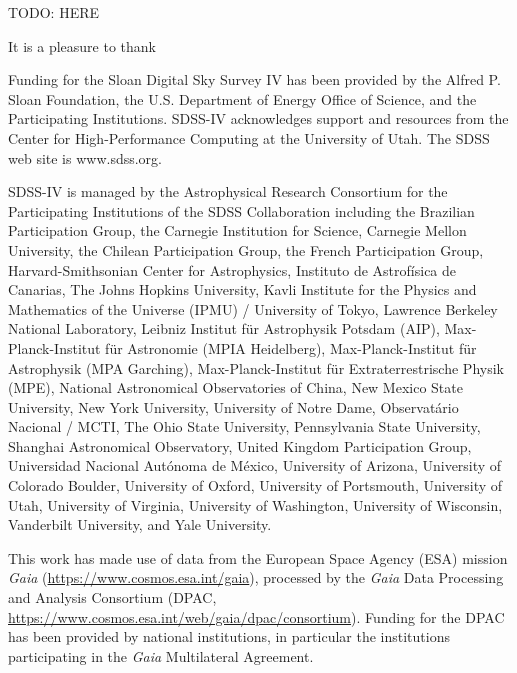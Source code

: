 \documentclass[modern]{aastex63}
\begin{document}
TODO: HERE




\acknowledgements

It is a pleasure to thank


Funding for the Sloan Digital Sky Survey IV has been provided by the Alfred P.
Sloan Foundation, the U.S. Department of Energy Office of Science, and the
Participating Institutions. SDSS-IV acknowledges support and resources from the
Center for High-Performance Computing at the University of Utah. The SDSS web
site is www.sdss.org.

SDSS-IV is managed by the Astrophysical Research Consortium for the
Participating Institutions of the SDSS Collaboration including the Brazilian
Participation Group, the Carnegie Institution for Science, Carnegie Mellon
University, the Chilean Participation Group, the French Participation Group,
Harvard-Smithsonian Center for Astrophysics, Instituto de Astrof\'isica de
Canarias, The Johns Hopkins University, Kavli Institute for the Physics and
Mathematics of the Universe (IPMU) / University of Tokyo, Lawrence Berkeley
National Laboratory, Leibniz Institut f\"ur Astrophysik Potsdam (AIP),
Max-Planck-Institut f\"ur Astronomie (MPIA Heidelberg), Max-Planck-Institut
f\"ur Astrophysik (MPA Garching), Max-Planck-Institut f\"ur Extraterrestrische
Physik (MPE), National Astronomical Observatories of China, New Mexico State
University, New York University, University of Notre Dame, Observat\'ario
Nacional / MCTI, The Ohio State University, Pennsylvania State University,
Shanghai Astronomical Observatory, United Kingdom Participation Group,
Universidad Nacional Aut\'onoma de M\'exico, University of Arizona, University
of Colorado Boulder, University of Oxford, University of Portsmouth, University
of Utah, University of Virginia, University of Washington, University of
Wisconsin, Vanderbilt University, and Yale University.

This work has made use of data from the European Space Agency (ESA) mission
{\it Gaia} (\url{https://www.cosmos.esa.int/gaia}), processed by the {\it Gaia}
Data Processing and Analysis Consortium (DPAC,
\url{https://www.cosmos.esa.int/web/gaia/dpac/consortium}). Funding for the DPAC
has been provided by national institutions, in particular the institutions
participating in the {\it Gaia} Multilateral Agreement.
\end{document}

